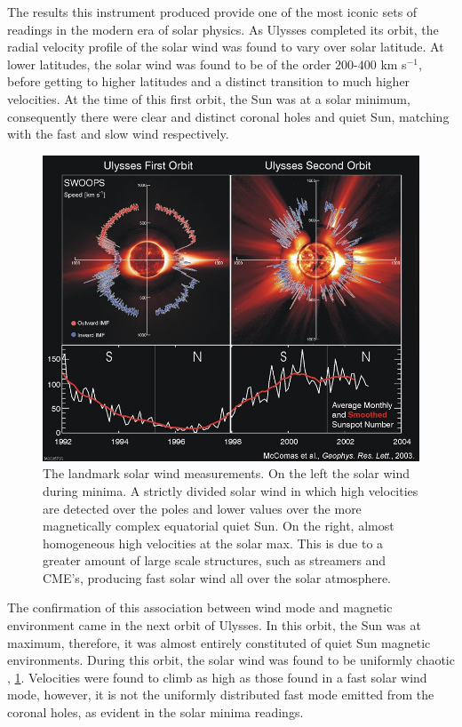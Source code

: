 The results this instrument produced provide one of the most iconic sets of readings in the modern era of solar physics.
As Ulysses completed its orbit, the radial velocity profile of the solar wind was found to vary over solar latitude.
At lower latitudes, the solar wind was found to be of the order $200$-$400$ km s$^{-1}$, before getting to higher latitudes and a distinct transition to much higher velocities.
At the time of this first orbit, the Sun was at a solar minimum, consequently there were clear and distinct coronal holes and quiet Sun, matching with the fast and slow wind respectively.

\begin{figure}
	\includegraphics[scale=0.5]{Chapter1/Figs/ulysses_solar_wind}
	\caption{The landmark solar wind measurements. On the left the solar wind during minima. A strictly divided solar wind in which high velocities are detected over the poles and lower values over the more magnetically complex equatorial quiet Sun. On the right, almost homogeneous high velocities at the solar max. This is due to a greater amount of large scale structures, such as streamers and CME's, producing fast solar wind all over the solar atmosphere.
		\cite{McComas2003}}
	\label{fig:ulysses_sw}
\end{figure}

The confirmation of this association between wind mode and magnetic environment came in the next orbit of Ulysses.
In this orbit, the Sun was at maximum, therefore, it was almost entirely constituted of quiet Sun magnetic environments.
During this orbit, the solar wind was found to be uniformly chaotic , \ref{fig:ulysses_sw}.
Velocities were found to climb as high as those found in a fast solar wind mode, however, it is not the uniformly distributed fast mode emitted from the coronal holes, as evident in the solar minima readings.

